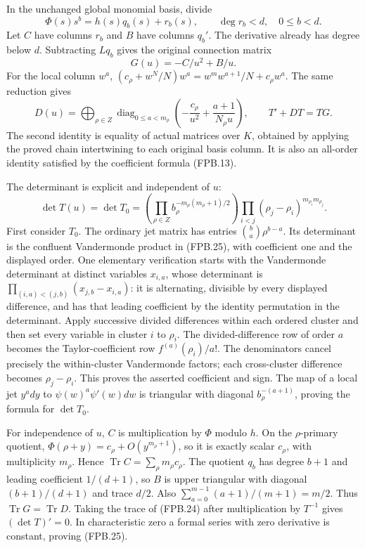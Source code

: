 In the unchanged global monomial basis, divide
\[
 \Phi(s)s^b=h(s)q_b(s)+r_b(s),\qquad \deg r_b<d,
 \quad 0\le b<d.
\]
Let \(C\) have columns \(r_b\) and \(B\) have columns
\(q_b'\). The derivative already has degree below \(d\).
Subtracting \(Lq_b\) gives the original connection matrix
\[
 G(u)=-C/u^2+B/u.
 \tag{FPB.23}\label{GraphV2:eq:fpb-G}
\]
For the local column \(w^a\),
\((c_\rho+w^N/N)w^a=w^m w^{a+1}/N+c_\rho w^a\).
The same reduction gives
\[
 D(u)=\bigoplus_{\rho\in Z}
  \operatorname{diag}_{0\le a<m_\rho}
    \left(-\frac{c_\rho}{u^2}
               +\frac{a+1}{N_\rho u}\right),
 \qquad T'+DT=TG.
 \tag{FPB.24}\label{GraphV2:eq:fpb-gauge}
\]
The second identity is equality of actual matrices over \(K\),
obtained by applying the proved chain intertwining to each original
basis column. It is also an all-order identity satisfied by the
coefficient formula (FPB.13).

The determinant is explicit and independent of \(u\):
\[
 \boxed{\displaystyle
 \det T(u)=\det T_0
   =\left(\prod_{\rho\in Z}
       b_\rho^{-m_\rho(m_\rho+1)/2}\right)
      \prod_{i<j}(\rho_j-\rho_i)^{m_{\rho_i}m_{\rho_j}}.}
 \tag{FPB.25}\label{GraphV2:eq:fpb-det}
\]
First consider \(T_0\). The ordinary jet matrix has entries
\(\binom ba\rho^{b-a}\). Its determinant is the confluent
Vandermonde product in (FPB.25), with coefficient one and the displayed
order. One elementary verification starts with the Vandermonde
determinant at distinct variables \(x_{i,a}\), whose determinant is
\(\prod_{(i,a)<(j,b)}(x_{j,b}-x_{i,a})\): it is alternating, divisible
by every displayed difference, and has that leading coefficient by
the identity permutation in the determinant. Apply successive divided
differences within each ordered cluster and then set every variable
in cluster \(i\) to \(\rho_i\). The divided-difference row of order
\(a\) becomes the Taylor-coefficient row \(f^{(a)}(\rho_i)/a!\).
The denominators cancel precisely the within-cluster Vandermonde
factors; each cross-cluster difference becomes \(\rho_j-\rho_i\).
This proves the asserted coefficient and sign. The map of a local
jet \(y^a dy\) to \(\psi(w)^a\psi'(w)dw\) is triangular with
diagonal \(b_\rho^{-(a+1)}\), proving the formula for \(\det T_0\).

For independence of \(u\), \(C\) is multiplication by \(\Phi\)
modulo \(h\). On the \(\rho\)-primary quotient,
\(\Phi(\rho+y)=c_\rho+O(y^{m_\rho+1})\), so it is exactly scalar
\(c_\rho\), with multiplicity \(m_\rho\). Hence
\(\operatorname{Tr}C=\sum_\rho m_\rho c_\rho\).
The quotient \(q_b\) has degree \(b+1\) and leading coefficient
\(1/(d+1)\), so \(B\) is upper triangular with diagonal
\((b+1)/(d+1)\) and trace \(d/2\). Also
\(\sum_{a=0}^{m-1}(a+1)/(m+1)=m/2\). Thus
\(\operatorname{Tr}G=\operatorname{Tr}D\).
Taking the trace of (FPB.24) after multiplication by \(T^{-1}\)
gives \((\det T)'=0\). In characteristic zero a formal series with
zero derivative is constant, proving (FPB.25).

